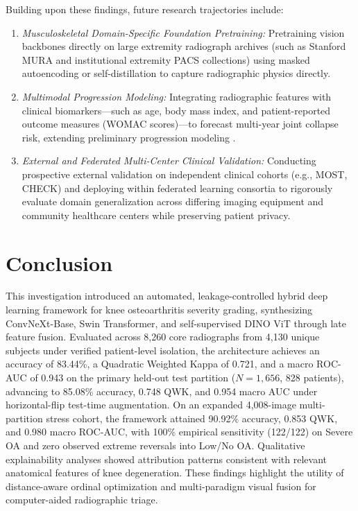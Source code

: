 \documentclass[10pt,journal]{IEEEtran}
\begin{document}
Building upon these findings, future research trajectories include:
\begin{enumerate}[leftmargin=*]
\item \textit{Musculoskeletal Domain-Specific Foundation Pretraining:} Pretraining vision backbones directly on large extremity radiograph archives (such as Stanford MURA and institutional extremity PACS collections) using masked autoencoding or self-distillation to capture radiographic physics directly.
\item \textit{Multimodal Progression Modeling:} Integrating radiographic features with clinical biomarkers---such as age, body mass index, and patient-reported outcome measures (WOMAC scores)---to forecast multi-year joint collapse risk, extending preliminary progression modeling \cite{guan2022deep}.
\item \textit{External and Federated Multi-Center Clinical Validation:} Conducting prospective external validation on independent clinical cohorts (e.g., MOST, CHECK) and deploying within federated learning consortia to rigorously evaluate domain generalization across differing imaging equipment and community healthcare centers while preserving patient privacy.
\end{enumerate}


\section{Conclusion}
\label{sec:conclusion}

This investigation introduced an automated, leakage-controlled hybrid deep learning framework for knee osteoarthritis severity grading, synthesizing ConvNeXt-Base, Swin Transformer, and self-supervised DINO ViT through late feature fusion. Evaluated across 8,260 core radiographs from 4,130 unique subjects under verified patient-level isolation, the architecture achieves an accuracy of 83.44\%, a Quadratic Weighted Kappa of 0.721, and a macro ROC-AUC of 0.943 on the primary held-out test partition ($N = 1{,}656$, 828 patients), advancing to 85.08\% accuracy, 0.748 QWK, and 0.954 macro AUC under horizontal-flip test-time augmentation. On an expanded 4,008-image multi-partition stress cohort, the framework attained 90.92\% accuracy, 0.853 QWK, and 0.980 macro ROC-AUC, with 100\% empirical sensitivity (122/122) on Severe OA and zero observed extreme reversals into Low/No OA. Qualitative explainability analyses showed attribution patterns consistent with relevant anatomical features of knee degeneration. These findings highlight the utility of distance-aware ordinal optimization and multi-paradigm visual fusion for computer-aided radiographic triage.
\end{document}
